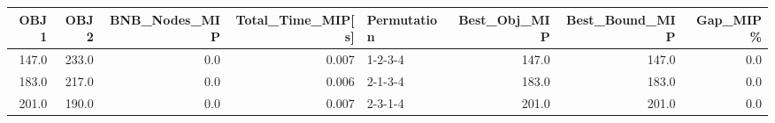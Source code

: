 \begin{tabular}{rrrrlrrr}
\toprule
  OBJ1 &   OBJ2 &  BNB\_Nodes\_MIP &  Total\_Time\_MIP[s] & Permutation &  Best\_Obj\_MIP &  Best\_Bound\_MIP &  Gap\_MIP\% \\
\midrule
 147.0 &  233.0 &            0.0 &              0.007 &     1-2-3-4 &         147.0 &           147.0 &       0.0 \\
 183.0 &  217.0 &            0.0 &              0.006 &     2-1-3-4 &         183.0 &           183.0 &       0.0 \\
 201.0 &  190.0 &            0.0 &              0.007 &     2-3-1-4 &         201.0 &           201.0 &       0.0 \\
\bottomrule
\end{tabular}
